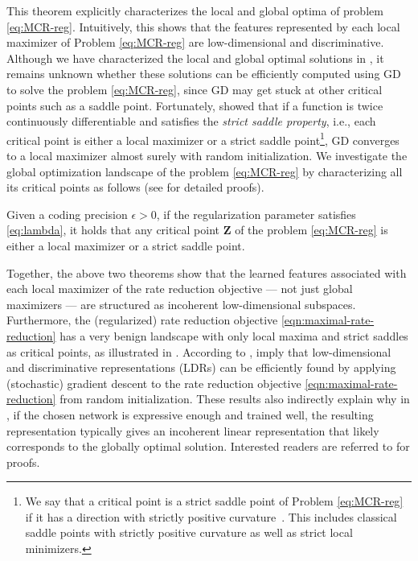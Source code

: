 \documentclass[../../book-main.tex]{subfiles}
\begin{document}
This theorem explicitly characterizes the local and global optima of
problem \eqref{eq:MCR-reg}. Intuitively, this shows that the features
represented by each local maximizer of Problem \eqref{eq:MCR-reg} are
low-dimensional and discriminative. Although we have characterized
the local and global optimal solutions in
, it remains unknown whether these
solutions can be efficiently computed using GD to solve the problem
\eqref{eq:MCR-reg}, since GD may get stuck at other critical points
such as a saddle point.
Fortunately, \cite{sun2015nonconvex,lee2016gradient} showed that if a
function is twice continuously differentiable and satisfies the {\em
strict saddle property}, i.e., each critical point is either a local
maximizer or a strict saddle point\footnote{We say that a critical
    point is a strict saddle point of Problem \eqref{eq:MCR-reg} if it
    has a direction with strictly positive
    curvature~\cite{sun2015nonconvex}. This includes classical saddle
    points with strictly positive curvature as well as strict local
minimizers.}, GD converges to a local maximizer almost surely with
random initialization. We investigate the global optimization
landscape of the problem \eqref{eq:MCR-reg} by characterizing all its
critical points as follows (see \cite[Theorem 3.3]{wang2024global}
for detailed proofs).

\begin{theorem}\label{thm:mcr-benign-opt-landscape}
    Given a coding precision $\epsilon > 0$, if the regularization
    parameter satisfies \eqref{eq:lambda},
    it holds that any critical point $\bm Z$ of the problem
    \eqref{eq:MCR-reg} is either a local maximizer or a strict saddle point.
\end{theorem}
Together, the above two theorems
show that the learned features associated with each local
maximizer of the rate
reduction objective --- not just global maximizers --- are structured
as incoherent low-dimensional subspaces. Furthermore, the
(regularized) rate reduction objective
\eqref{eqn:maximal-rate-reduction} has a very benign landscape with
only local maxima and strict saddles as critical points, as
illustrated in .
According to \cite{sun2015nonconvex,lee2016gradient},
 imply that
low-dimensional and discriminative representations (LDRs) can be
efficiently found by applying (stochastic) gradient descent to the
rate reduction objective \eqref{eqn:maximal-rate-reduction} from
random initialization. These results also indirectly explain why in
, if the chosen network is expressive
enough and trained well, the resulting representation typically gives
an incoherent linear representation that likely corresponds to the
globally optimal solution.
Interested readers are referred to \cite{wang2024global} for proofs.
\end{document}
